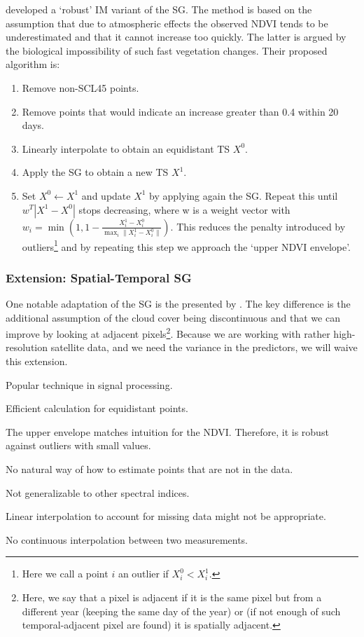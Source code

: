 		\cite{chenSimpleMethodReconstructing2004a} developed a `robust' {{IM}} variant of the SG. 
		The method is based on the assumption that due to atmospheric effects the observed NDVI tends to be underestimated and that it cannot increase too quickly. The latter is argued by the biological impossibility of such fast vegetation changes. Their proposed algorithm is:
			\begin{enumerate}
				\item Remove non-SCL45 points.
				\item Remove points that would indicate an increase greater than 0.4 within 20 days.
				\item Linearly interpolate to obtain an equidistant {TS} $X^0$.
				\item Apply the SG to obtain a new {TS} $X^1$.
				\item Set $X^0\leftarrow X^1$ and update $X^1$ by applying again the SG. Repeat this until $w^T |X^1-X^0|$ stops decreasing, where w is a weight vector with $w_i = \min\left(1, 1 - \frac{X^1_i-X^0_i}{\max_i\|X^1_i-X^0_i\|}\right)$. This reduces the penalty introduced by outliers\footnote{Here we call a point $i$ an outlier if $X^0_i<X^1_i$.} and by repeating this step we approach the `upper NDVI envelope'.
			\end{enumerate}

		\subsubsection*{Extension: Spatial-Temporal SG}
			One notable adaptation of the SG is the presented by \cite{caoSimpleMethodImprove2018b}. The key difference is the additional assumption of the cloud cover being discontinuous and that we can improve by looking at adjacent pixels\footnote{Here, we say that a pixel is adjacent if it is the same pixel but from a different year (keeping the same day of the year) or (if not enough of such temporal-adjacent pixel are found) it is spatially adjacent.}. Because we are working with rather high-resolution satellite data, and we need the variance in the predictors, we will waive this extension.

		\begin{my_pros_cons_table}{
				\item Popular technique in signal processing.
				\item Efficient calculation for equidistant points.
				\item The upper envelope matches intuition for the NDVI. Therefore, it is robust against outliers with small values.
			}{
				\item No natural way of how to estimate points that are not in the data.
				\item Not generalizable to other spectral indices.
				\item Linear interpolation to account for missing data might not be appropriate.
				\item No continuous interpolation between two measurements.
			}
		\end{my_pros_cons_table}


